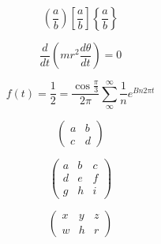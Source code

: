 \documentclass[12pt, a4paper, brazil, oneside]{book}
\begin{document}
\begin{equation}
\left( \frac{a}{b}\right)
\left[  \frac{a}{b}\right] 
\left\lbrace \frac{a}{b}\right\rbrace  
\end{equation}

\begin{equation}
\frac{d}{dt} \left( {mr^2\frac{d\theta}{dt}}\right)= 0
\end{equation}

\begin{equation}
f(t) = \frac{1}{2} =\frac{\cos\frac{\pi}{3}}{2\pi} \sum_\infty^\infty \frac{1}{n}e^{Bn2\pi t}
\end{equation}

\begin{equation}
\left( 
\begin{array} {lr}
	a & b \\
	c & d
\end{array} \right) 
\end{equation}

\begin{equation}
\left( 
\begin{array} {lcr}
	a & b & c \\
	d & e & f \\
	g & h & i
\end{array} \right) 
\end{equation}

\begin{equation}
\begin{pmatrix}
	x&y&z\\
	w&h&r
\end{pmatrix}
\end{equation}
\end{document}
